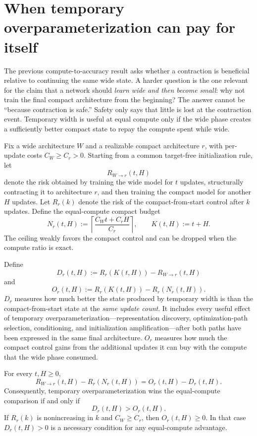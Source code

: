 \section{When temporary overparameterization can pay for itself}
The previous compute-to-accuracy result asks whether a contraction is beneficial relative to continuing the same wide state. A harder question is the one relevant for the claim that a network should \emph{learn wide and then become small}: why not train the final compact architecture from the beginning? The answer cannot be ``because contraction is safe.'' Safety only says that little is lost at the contraction event. Temporary width is useful at equal compute only if the wide phase creates a sufficiently better compact state to repay the compute spent while wide.

Fix a wide architecture $W$ and a realizable compact architecture $r$, with per-update costs $C_W\ge C_r>0$. Starting from a common target-free initialization rule, let
\[
R_{W\to r}(t,H)
\]
denote the risk obtained by training the wide model for $t$ updates, structurally contracting it to architecture $r$, and then training the compact model for another $H$ updates. Let $R_r(k)$ denote the risk of the compact-from-start control after $k$ updates. Define the equal-compute compact budget
\[
N_r(t,H)
:=
\left\lceil\frac{C_Wt+C_rH}{C_r}\right\rceil,
\qquad
K(t,H):=t+H.
\]
The ceiling weakly favors the compact control and can be dropped when the compute ratio is exact.

\begin{definition}
Define
\[
D_r(t,H)
:=R_r(K(t,H))-R_{W\to r}(t,H)
\]
and
\[
O_r(t,H)
:=R_r(K(t,H))-R_r(N_r(t,H)).
\]
$D_r$ measures how much better the state produced by temporary width is than the compact-from-start state at the \emph{same update count}. It includes every useful effect of temporary overparameterization---representation discovery, optimization-path selection, conditioning, and initialization amplification---after both paths have been expressed in the same final architecture. $O_r$ measures how much the compact control gains from the additional updates it can buy with the compute that the wide phase consumed.
\end{definition}

\begin{theorem}\label{thm:temporary-width-break-even}
For every $t,H\ge0$,
\[
\boxed{
R_{W\to r}(t,H)-R_r(N_r(t,H))
=
O_r(t,H)-D_r(t,H).}
\]
Consequently, temporary overparameterization wins the equal-compute comparison if and only if
\[
\boxed{D_r(t,H)>O_r(t,H).}
\]
If $R_r(k)$ is nonincreasing in $k$ and $C_W\ge C_r$, then $O_r(t,H)\ge0$. In that case $D_r(t,H)>0$ is a necessary condition for any equal-compute advantage.
\end{theorem}

